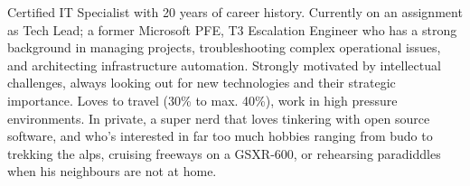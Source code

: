 %
%
%
\par{
Certified IT Specialist with 20 years of career history. Currently on an assignment as Tech Lead; a former Microsoft PFE, T3 Escalation Engineer who has a strong background in managing projects, troubleshooting complex operational issues, and architecting infrastructure automation. 
Strongly motivated by intellectual challenges, always looking out for new technologies and their strategic importance. Loves to travel (30\% to max. 40\%), work in high pressure environments. 
In private, a super nerd that loves tinkering with open source software, and who’s interested in far too much hobbies ranging from budo to trekking the alps, cruising freeways on a GSXR-600, or rehearsing paradiddles when his neighbours are not at home.
}